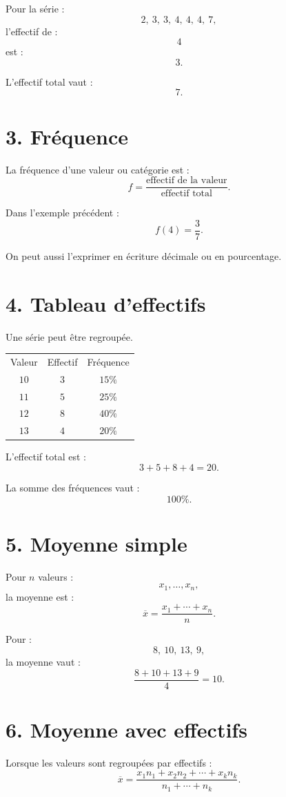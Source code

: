 Pour la série :
\[
2,\ 3,\ 3,\ 4,\ 4,\ 4,\ 7,
\]
l'effectif de :
\[
4
\]
est :
\[
3.
\]

L'effectif total vaut :
\[
7.
\]

\section{3. Fréquence}

La fréquence d'une valeur ou catégorie est :
\[
\boxed{
f=\dfrac{\text{effectif de la valeur}}{\text{effectif total}}
}.
\]

Dans l'exemple précédent :
\[
f(4)=\dfrac37.
\]

On peut aussi l'exprimer en écriture décimale ou en pourcentage.

\section{4. Tableau d'effectifs}

Une série peut être regroupée.

\begin{tabular}{c|c|c}
Valeur & Effectif & Fréquence \\
$10$ & $3$ & $15\%$ \\
$11$ & $5$ & $25\%$ \\
$12$ & $8$ & $40\%$ \\
$13$ & $4$ & $20\%$ \\
\end{tabular}

L'effectif total est :
\[
3+5+8+4=20.
\]

La somme des fréquences vaut :
\[
100\%.
\]

\section{5. Moyenne simple}

Pour $n$ valeurs :
\[
x_1,\ldots,x_n,
\]
la moyenne est :
\[
\boxed{
\overline{x}=\dfrac{x_1+\cdots+x_n}{n}
}.
\]

Pour :
\[
8,\ 10,\ 13,\ 9,
\]
la moyenne vaut :
\[
\dfrac{8+10+13+9}{4}=10.
\]

\section{6. Moyenne avec effectifs}

Lorsque les valeurs sont regroupées par effectifs :
\[
\boxed{
\overline{x}
=
\dfrac{x_1n_1+x_2n_2+\cdots+x_kn_k}{n_1+\cdots+n_k}
}.
\]

